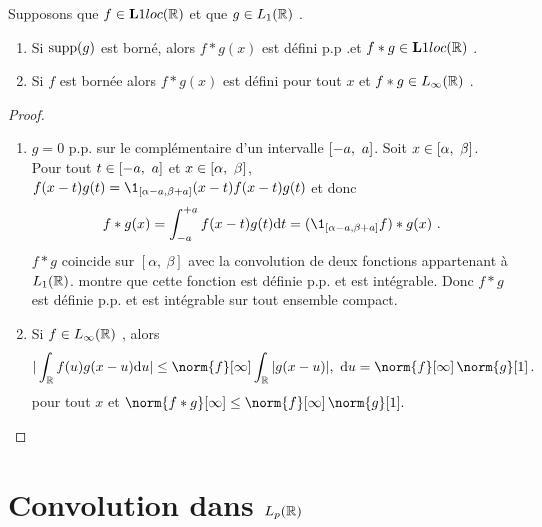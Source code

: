 \begin{proposition}
Supposons que $f\in {\bf L}1loc(\mathbb{R})$ et que $g\in L_1(\mathbb{R})$ .
\begin{enumerate}[label=(\roman*)]
\item Si $\mathrm{supp}(g)$ est born\'e, alors $f*g(x)$ est d\'efini p.p .et $f * g \in {\bf L}1loc(\mathbb{R})$ .
\item Si $f$ est born\'ee alors $f*g(x)$ est d\'efini pour tout $x$ et  $f * g \in L_{\infty}(\mathbb{R})$ .
\end{enumerate}
\end{proposition}
\begin{proof}
\begin{enumerate}[label=(\roman*), wide=0pt, labelindent=\parindent]
\item $g = 0$ p.p. sur le compl\'ementaire d'un intervalle $\left[-a,\ a\right]$. Soit $x \in \left[\alpha,\ \beta\right]$. Pour tout $t\in \left[-a,\ a\right]$ et $x\in \left[\alpha,\ \beta\right]$,
$f(x-t)g(t)=\1_{[\alpha-a,\beta+a]}(x-t)f(x-t)g(t)$  et donc
$$
f*g(x)=\int_{-a}^{+a}f(x-t)g(t)\rmd t=(\1_{[\alpha-a,\beta+a]}f)*g(x)\ .
$$
$f*g$ coincide sur $[\alpha,\ \beta]$ avec la convolution de deux fonctions appartenant \`a $L_1(\mathbb{R})$.  montre que cette fonction est d\'efinie p.p. et est int\'egrable. Donc $f*g$ est d\'efinie p.p. et est int\'egrable sur tout ensemble compact.
\item Si $f\in L_{\infty}(\mathbb{R})$ , alors
$$
|\int_{\rset}f(u)g(x-u)\rmd u|\leq\norm{f}[\infty]\int_{\rset}|g(x-u)|,\ \rmd u=\norm{f}[\infty] \,
\norm{g}[1] \, .
$$
pour tout $x$ et $\norm{f*g}[\infty]\leq \norm{f}[\infty] \, \norm{g}[1].$
\end{enumerate}
\end{proof}
\section{Convolution dans $L_{p}(\mathbb{R})$}



